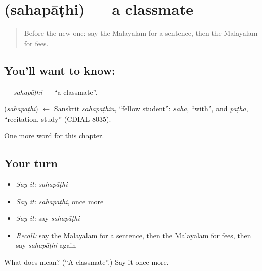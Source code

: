 \section[\texorpdfstring{\ml{സഹപാഠി} (sahapāṭhi)}{സഹപാഠി (sahapāṭhi)}]{ (sahapāṭhi) — a classmate}

\label{lesson:ML-C221-sahapathi}



\begin{quote}
Before the new one: say the Malayalam for a sentence, then the Malayalam for fees.
\end{quote}

\subsection*{You'll want to know: }
\textbf{} — \emph{sahapāṭhi} — \textquotedblleft{}a classmate\textquotedblright{}.

\begin{cousinweb}
\textbf{} (\emph{sahapāṭhi}) $\leftarrow$ Sanskrit \emph{sahapāṭhin}, \textquotedblleft{}fellow student\textquotedblright{}: \emph{saha}, \textquotedblleft{}with\textquotedblright{}, and \emph{pāṭha}, \textquotedblleft{}recitation, study\textquotedblright{} (CDIAL 8035).
\end{cousinweb}

\begin{grammarlens}[title={What you've built}]
One more word for this chapter.
\end{grammarlens}

\subsection*{Your turn}
\begin{itemize}
\raggedright
  \item \emph{Say it:} \emph{sahapāṭhi}
  \item \emph{Say it:} \emph{sahapāṭhi}, once more
  \item \emph{Say it:} say \emph{sahapāṭhi}
  \item \emph{Recall:} say the Malayalam for a sentence, then the Malayalam for fees, then say \emph{sahapāṭhi} again
\end{itemize}

\begin{tcolorbox}[breakable,colback=teal!4,colframe=teal!35!black,title={Before you move on}]
What does  mean? (\textquotedblleft{}A classmate\textquotedblright{}.) Say it once more.
\end{tcolorbox}
